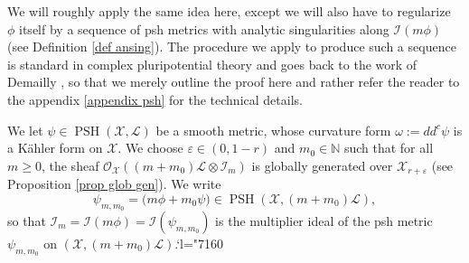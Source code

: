 \documentclass[JEP,XML,SOM,Unicode,published]{cedram}
\newcommand{\Changel}{\mathcode`l="7160}
\theoremstyle{definition}
\newcommand \N{\mathbb N}
\newcommand \gO {\mathcal O}
\newcommand \Ld {\mathscr {L}}
\newcommand \X {\mathscr{X}}
\let\eps\varepsilon
\DeclareMathOperator{\PSH}{PSH}
\begin{document}
We will roughly apply the same idea here, except we will also have to regularize~$\phi$ itself by a sequence of psh metrics with analytic singularities along $\mathscr{I}(m \phi)$ (see Definition \ref{def ansing}). The procedure we apply to produce such a sequence is standard in complex pluripotential theory and goes back to the work of Demailly \cite{Dem}, so that we merely outline the proof here and rather refer the reader to the appendix \ref{appendix psh} for the technical details.

We let $\psi \in \PSH(\X, \Ld)$ be a smooth metric, whose curvature form $\omega:= dd^c \psi$ is a Kähler form on $\X$. We choose $\eps \in (0, 1-r)$ and $m_0 \in \N$ such that for all $m \ge 0$, the sheaf $\gO_{\X}((m+m_0)\Ld \otimes \mathscr{I}_m)$ is globally generated over $\X_{r+\eps}$ (see Proposition \ref{prop glob gen}). We write
\[
\psi_{m, m_0} = \bigl(m \phi + m_0\psi \bigr) \in \PSH(\X, (m+m_0)\Ld),
\]
so that $\mathscr{I}_m = \mathscr{I}(m\phi) = \mathscr{I}(\psi_{m, m_0}) $ is the multiplier ideal of the psh metric $\psi_{m, m_0}$ on $(\X, (m+m_0)\Ld)$.\Changel
\end{document}
